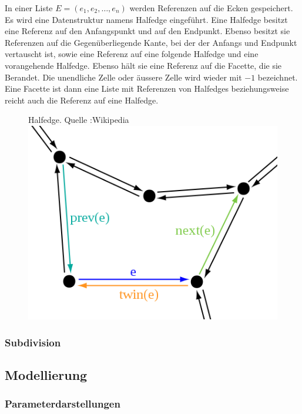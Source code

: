 \begin{Definition}[Halfedge]
In einer Liste $E = (e_1, e_2, \hdots, e_n)$ werden Referenzen auf die Ecken gespeichert.  Es wird eine Datenstruktur namens Halfedge eingeführt.
Eine Halfedge besitzt eine Referenz auf den Anfangspunkt und auf den Endpunkt. Ebenso besitzt sie Referenzen auf die Gegenüberliegende Kante, bei der der Anfangs und Endpunkt vertauscht ist, sowie eine Referenz auf eine folgende Halfedge  und eine vorangehende Halfedge. Ebenso hält sie eine Referenz auf die Facette, die sie Berandet. Die unendliche Zelle oder äussere Zelle wird wieder  mit $-1$ bezeichnet. Eine Facette ist dann eine Liste mit Referenzen von Halfedges beziehungsweise reicht auch die  Referenz auf eine Halfedge.
\end{Definition}

\begin{figure}[H]
\centering
Halfedge. Quelle :Wikipedia \\
\includegraphics[scale=0.5]{images/halfedge.png}
\end{figure}

\subsubsection{Subdivision}



\subsection{Modellierung}

\subsubsection{Parameterdarstellungen}

